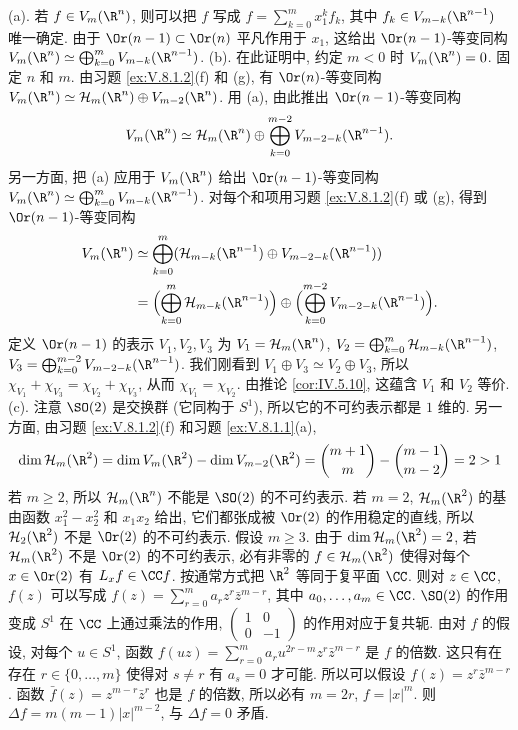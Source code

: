 \begin{solution}
(a). 若 $f \in V_m(\R^n)$, 则可以把 $f$ 写成 $f = \sum_{k=0}^m x_1^kf_k$, 其中 $f_k \in V_{m-k}(\R^{n-1})$ 唯一确定. 由于 $\Or(n-1) \subset \Or(n)$ 平凡作用于 $x_1$, 这给出 $\Or(n-1)$-等变同构 $V_m(\R^n) \simeq \bigoplus_{k=0}^m V_{m-k}(\R^{n-1})$.
(b). 在此证明中, 约定 $m < 0$ 时 $V_m(\R^n) = 0$. 固定 $n$ 和 $m$. 由习题 \ref{ex:V.8.1.2}(f) 和 (g), 有 $\Or(n)$-等变同构 $V_m(\R^n) \simeq \mathcal{H}_m(\R^n) \oplus V_{m-2}(\R^n)$. 用 (a), 由此推出 $\Or(n-1)$-等变同构
\[
V_m(\R^n) \simeq \mathcal{H}_m(\R^n) \oplus \bigoplus_{k=0}^{m-2}V_{m-2-k}(\R^{n-1}).
\]
另一方面, 把 (a) 应用于 $V_m(\R^n)$ 给出 $\Or(n-1)$-等变同构 $V_m(\R^n) \simeq \bigoplus_{k=0}^m V_{m-k}(\R^{n-1})$. 对每个和项用习题 \ref{ex:V.8.1.2}(f) 或 (g), 得到 $\Or(n-1)$-等变同构
\begin{align*}
V_m(\R^n) &\simeq \bigoplus_{k=0}^m(\mathcal{H}_{m-k}(\R^{n-1}) \oplus V_{m-2-k}(\R^{n-1})) \\
&= \Bigl(\bigoplus_{k=0}^m\mathcal{H}_{m-k}(\R^{n-1})\Bigr) \oplus \Bigl(\bigoplus_{k=0}^{m-2}V_{m-2-k}(\R^{n-1})\Bigr).
\end{align*}
定义 $\Or(n-1)$ 的表示 $V_1, V_2, V_3$ 为 $V_1 = \mathcal{H}_m(\R^n)$, $V_2 = \bigoplus_{k=0}^m\mathcal{H}_{m-k}(\R^{n-1})$, $V_3 = \bigoplus_{k=0}^{m-2}V_{m-2-k}(\R^{n-1})$. 我们刚看到 $V_1 \oplus V_3 \simeq V_2 \oplus V_3$, 所以 $\chi_{V_1} + \chi_{V_3} = \chi_{V_2} + \chi_{V_3}$, 从而 $\chi_{V_1} = \chi_{V_2}$. 由推论 \ref{cor:IV.5.10}, 这蕴含 $V_1$ 和 $V_2$ 等价.
(c). 注意 $\SO(2)$ 是交换群 (它同构于 $S^1$), 所以它的不可约表示都是 $1$ 维的. 另一方面, 由习题 \ref{ex:V.8.1.2}(f) 和习题 \ref{ex:V.8.1.1}(a),
\[
\dim\mathcal{H}_m(\R^2) = \dim V_m(\R^2) - \dim V_{m-2}(\R^2) = \binom{m+1}{m} - \binom{m-1}{m-2} = 2 > 1
\]
若 $m \geq 2$, 所以 $\mathcal{H}_m(\R^n)$ 不能是 $\SO(2)$ 的不可约表示.
若 $m = 2$, $\mathcal{H}_m(\R^2)$ 的基由函数 $x_1^2 - x_2^2$ 和 $x_1x_2$ 给出, 它们都张成被 $\Or(2)$ 的作用稳定的直线, 所以 $\mathcal{H}_2(\R^2)$ 不是 $\Or(2)$ 的不可约表示.
假设 $m \geq 3$. 由于 $\dim\mathcal{H}_m(\R^2) = 2$, 若 $\mathcal{H}_m(\R^2)$ 不是 $\Or(2)$ 的不可约表示, 必有非零的 $f \in \mathcal{H}_m(\R^2)$ 使得对每个 $x \in \Or(2)$ 有 $L_xf \in \CC f$. 按通常方式把 $\R^2$ 等同于复平面 $\CC$. 则对 $z \in \CC$, $f(z)$ 可以写成 $f(z) = \sum_{r=0}^m a_rz^r\bar{z}^{m-r}$, 其中 $a_0, \ldots, a_m \in \CC$. $\SO(2)$ 的作用变成 $S^1$ 在 $\CC$ 上通过乘法的作用, $\begin{pmatrix} 1 & 0 \\ 0 & -1 \end{pmatrix}$ 的作用对应于复共轭. 由对 $f$ 的假设, 对每个 $u \in S^1$, 函数 $f(uz) = \sum_{r=0}^m a_ru^{2r-m}z^r\bar{z}^{m-r}$ 是 $f$ 的倍数. 这只有在存在 $r \in \{0, \ldots, m\}$ 使得对 $s \neq r$ 有 $a_s = 0$ 才可能. 所以可以假设 $f(z) = z^r\bar{z}^{m-r}$. 函数 $\bar{f}(z) = z^{m-r}\bar{z}^r$ 也是 $f$ 的倍数, 所以必有 $m = 2r$, $f = |x|^m$. 则 $\Delta f = m(m-1)|x|^{m-2}$, 与 $\Delta f = 0$ 矛盾.

\end{solution}
